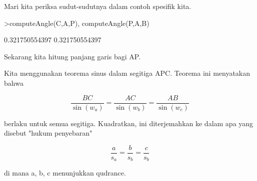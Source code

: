 \documentclass[a4paper,10pt]{article}
\begin{document}
\begin{eulernotebook}
\begin{eulercomment}
\begin{eulercomment}
\begin{eulercomment}
\begin{eulercomment}
\begin{eulercomment}
Mari kita periksa sudut-sudutnya dalam contoh spesifik kita.
\end{eulercomment}
\begin{eulerprompt}
>computeAngle(C,A,P), computeAngle(P,A,B)
\end{eulerprompt}
\begin{euleroutput}
  0.321750554397
  0.321750554397
\end{euleroutput}
\begin{eulercomment}
Sekarang kita hitung panjang garis bagi AP.

Kita menggunakan teorema sinus dalam segitiga APC. Teorema ini
menyatakan bahwa

\end{eulercomment}
\begin{eulerformula}
\[
\frac{BC}{\sin(w_a)} = \frac{AC}{\sin(w_b)} = \frac{AB}{\sin(w_c)}
\]
\end{eulerformula}
\begin{eulercomment}
berlaku untuk semua segitiga. Kuadratkan, ini diterjemahkan ke dalam
apa yang disebut "hukum penyebaran"

\end{eulercomment}
\begin{eulerformula}
\[
\frac{a}{s_a} = \frac{b}{s_b} = \frac{c}{s_b}
\]
\end{eulerformula}
\begin{eulercomment}
di mana a, b, c menunjukkan qudrance.


\end{eulercomment}
\end{eulercomment}
\end{eulercomment}
\end{eulercomment}
\end{eulercomment}
\end{eulernotebook}
\end{document}
